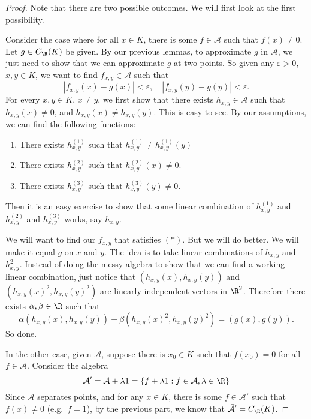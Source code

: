 \documentclass[a4paper]{article}
\begin{document}
\begin{proof}
  Note that there are two possible outcomes. We will first look at the first possibility.

  Consider the case where for all $x \in K$, there is some $f \in \mathcal{A}$ such that $f(x) \not= 0$. Let $g \in C_{\R}(K)$ be given. By our previous lemmas, to approximate $g$ in $\bar{\mathcal{A}}$, we just need to show that we can approximate $g$ at two points. So given any $\varepsilon > 0$, $x, y \in K$, we want to find $f_{x, y} \in \mathcal{A}$ such that
  \[
    |f_{x, y}(x) - g(x)| < \varepsilon,\quad |f_{x, y}(y) - g(y)| < \varepsilon. \tag{$*$}
  \]
  For every $x, y \in K$, $x \not= y$, we first show that there exists $h_{x, y} \in \mathcal{A}$ such that $h_{x, y}(x) \not= 0$, and $h_{x, y}(x) \not= h_{x, y}(y)$. This is easy to see. By our assumptions, we can find the following functions:
  \begin{enumerate}
    \item There exists $h_{x, y}^{(1)}$ such that $h_{x, y}^{(1)} \not= h_{x, y}^{(1)}(y)$
    \item There exists $h_{x, y}^{(2)}$ such that $h_{x, y}^{(2)}(x) \not= 0$.
    \item There exists $h_{x, y}^{(3)}$ such that $h_{x, y}^{(3)}(y) \not= 0$.
  \end{enumerate}
  Then it is an easy exercise to show that some linear combination of $h_{x, y}^{(1)}$ and $h_{x, y}^{(2)}$ and $h_{x, y}^{(3)}$ works, say $h_{x, y}$.

  We will want to find our $f_{x, y}$ that satisfies $(*)$. But we will do better. We will make it equal $g$ on $x$ and $y$. The idea is to take linear combinations of $h_{x, y}$ and $h_{x, y}^2$. Instead of doing the messy algebra to show that we can find a working linear combination, just notice that $(h_{x, y}(x), h_{x, y}(y))$ and $(h_{x, y}(x)^2, h_{x, y}(y)^2)$ are linearly independent vectors in $\R^2$. Therefore there exists $\alpha, \beta \in \R$ such that
  \[
    \alpha(h_{x, y}(x), h_{x, y}(y)) + \beta(h_{x, y}(x)^2, h_{x, y}(y)^2) = (g(x), g(y)).
  \]
  So done.

  In the other case, given $\mathcal{A}$, suppose there is $x_0 \in K$ such that $f(x_0) = 0$ for all $f \in \mathcal{A}$. Consider the algebra
  \[
    \mathcal{A}' = \mathcal{A} + \lambda 1 = \{f + \lambda 1: f \in \mathcal{A}, \lambda \in \R\}
  \]
  Since $\mathcal{A}$ separates points, and for any $x \in K$, there is some $f \in \mathcal{A}'$ such that $f(x) \not= 0$ (e.g.\ $f = 1$), by the previous part, we know that $\bar{\mathcal{A}}' = C_{\R}(K)$.


\end{proof}
\end{document}
